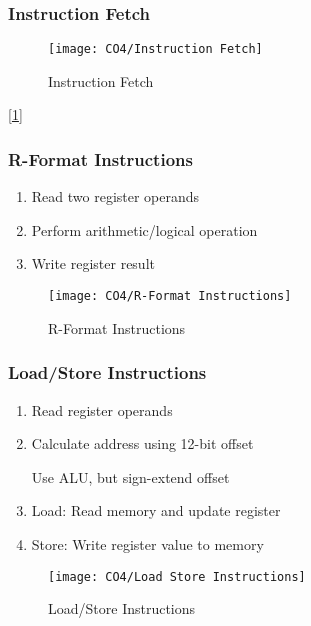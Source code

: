 \subsubsection{Instruction Fetch}
\begin{figure}[!htb]
    \centering
    \texttt{[image: CO4/Instruction Fetch]}
    \caption{Instruction Fetch}
    \label{Instruction Fetch}
\end{figure}
[\ref{Instruction Fetch}]


\subsubsection{R-Format Instructions}
\begin{enumerate}
    \item Read two register operands
    \item Perform arithmetic/logical operation
    \item Write register result
\end{enumerate}

\begin{figure}[!htb]
    \centering
    \texttt{[image: CO4/R-Format Instructions]}
    \caption{R-Format Instructions}
\end{figure}

\subsubsection{Load/Store Instructions}
\begin{enumerate}
    \item Read register operands
    \item Calculate address using 12-bit offset 
    
    \small Use ALU, but sign-extend offset
    \item Load: Read memory and update register
    \item Store: Write register value to memory
\end{enumerate}

\begin{figure}[!htb]
    \centering
    \texttt{[image: CO4/Load Store Instructions]}
    \caption{Load/Store Instructions}
\end{figure}

